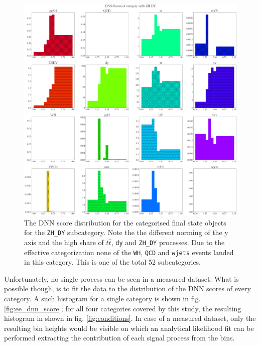 \begin{figure}[h!]
	\centering
	\includegraphics[width=\linewidth]{figures/analysis/ee_2b_dnn_node_ZH_DY.pdf}
	\caption{The DNN score distribution for the categorised final state objects for the \texttt{ZH\_DY} subcategory. Note the the different norming of the y axis and the high share of $t\bar{t}$, \texttt{dy} and \texttt{ZH\_DY} processes. Due to the effective categorization none of the \texttt{WH}, \texttt{QCD} and \texttt{wjets} events landed in this category. This is one of the total 52 subcategories.}
	\label{fig:ZH_DY_sub}
\end{figure}

Unfortunately, no single process can be seen in a measured dataset. What is possible though, is to fit the data to the distribution of the DNN scores of every category. A such histogram for a single category is shown in fig. \ref{fig:ee_dnn_score}; for all four categories covered by this study, the resulting histogram in shown in fig. \ref{fig:conditions}. In case of a measured dataset, only the resulting bin heights would be visible on which an analytical likelihood fit can be performed extracting the contribution of each signal process from the bins.

